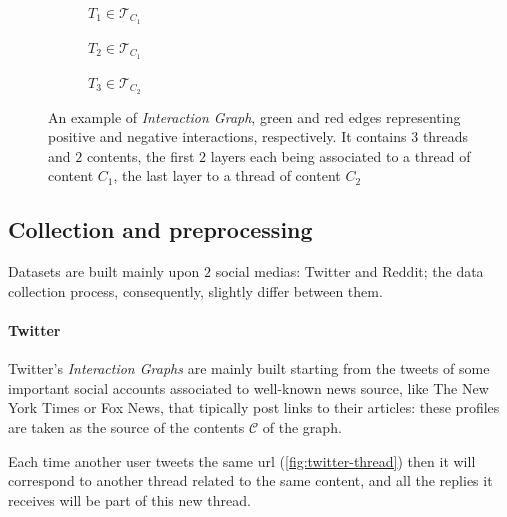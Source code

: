 \begin{figure}
	\begin{center}
		\begin{subfigure}[b]{0.3\textwidth}
			\centering
			\caption{$T_{1} \in \mathcal{T}_{C_{1}} $}
			\label{fig:tex/tikz/graph_thread1.tikz}
		\end{subfigure}
		\begin{subfigure}[b]{0.3\textwidth}
			\centering
			\caption{$T_{2} \in \mathcal{T}_{C_{1}} $}
			\label{fig:tex/tikz/graph_thread2.tikz}
		\end{subfigure}
		\begin{subfigure}[b]{0.3\textwidth}
			\centering
			\caption{$T_{3} \in \mathcal{T}_{C_{2}} $}
			\label{fig:tex/tikz/graph_thread3.tikz}
		\end{subfigure}
	\end{center}
	\caption[Example \emph{Interaction Graph}]{An example of \emph{Interaction Graph}, green and red edges
		representing positive and negative interactions, respectively. It
		contains $3$ threads and $2$ contents, the first $2$ layers each being
		associated to a thread of content $C_{1} $, the last layer to a thread
		of content $C_{2} $}
	\label{fig:interaction-graph-example}
\end{figure}

\subsection{Collection and preprocessing}%
\label{sub:collection_and_preprocessing}

Datasets are built mainly upon $2$ social medias: Twitter and Reddit; the data
collection process, consequently, slightly differ between them.

\paragraph{Twitter}%
\label{par:twitter-data}

Twitter's \emph{Interaction Graphs} are mainly built starting from the tweets
of some important social accounts associated to well-known news source, like The
New York Times or Fox News, that tipically post links to their articles:
these profiles are taken as the source of the contents $\mathcal{C} $ of the graph.

Each time another user tweets the same url (\autoref{fig:twitter-thread}) then
it will correspond to another thread related to the same content, and all the
replies it receives will be part of this new thread.

